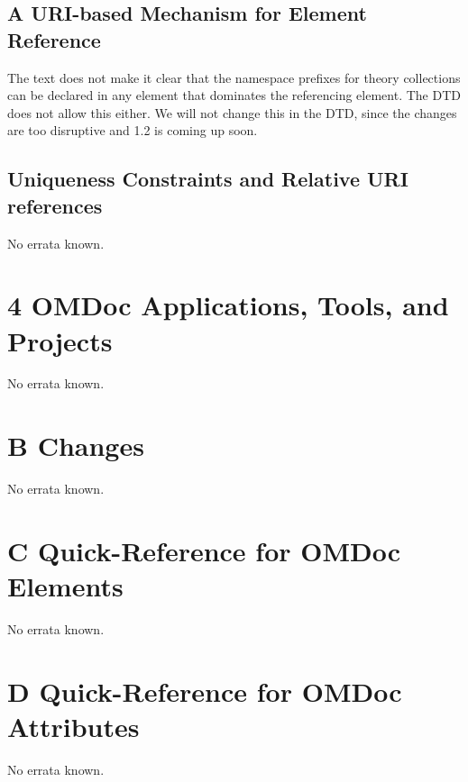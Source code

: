\subsection*{A URI-based Mechanism for Element Reference}
The text does not make it clear that the namespace prefixes for theory collections
can be declared in any element that dominates the referencing element. The DTD
does not allow this either. We will not change this in the DTD, since the changes
are too disruptive and {\omdoc}1.2 is coming up soon. 

\subsection*{Uniqueness Constraints and Relative URI references}
No errata known.
\section*{4 OMDoc Applications, Tools,  and Projects}
No errata known.

\section*{B Changes}
  No errata known.
\section*{C Quick-Reference for OMDoc Elements}
No errata known.
\section*{D Quick-Reference for OMDoc Attributes}
No errata known.
